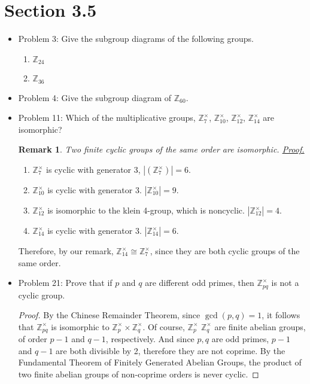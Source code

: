 \documentclass[hidelinks,12pt]{article}
\title{\scalebox{2}{Math 531 Homework 6}}
\author{\scalebox{1.5}{Theo Koss}}
\date{March 2021}
\newtheorem*{remark}{Remark}
\newcommand{\Z}{\mathbb{Z}}
\begin{document}
\graphicspath{{/home/theo/Documents/GitHub/Math-Homeworks/Math 531/Random/}}
\maketitle
\section{Section 3.5}
\begin{itemize}
\item Problem 3: Give the subgroup diagrams of the following groups.\begin{enumerate}[label=(\alph*)]
    \item $\Z_{24}$\newline{}
    \item $\Z_{36}$\newline{}
\end{enumerate}
\item Problem 4: Give the subgroup diagram of $\Z_{60}$.\newline{}
\item Problem 11: Which of the multiplicative groups, $\Z^{\times}_7$, $\Z^{\times}_{10}$, $\Z^{\times}_{12}$, $\Z^{\times}_{14}$ are isomorphic?\newline \begin{remark}Two finite cyclic groups of the same order are isomorphic. \href{https://proofwiki.org/wiki/Cyclic_Groups_of_Same_Order_are_Isomorphic}{\color{cyan}Proof.} \end{remark}\begin{enumerate}
    \item $\Z^{\times}_7$ is cyclic with generator 3, $|(\Z^{\times}_7)|=6$.
    \item $\Z^{\times}_{10}$ is cyclic with generator 3. $|\Z^{\times}_{10}|=9$.
    \item $\Z^{\times}_{12}$ is isomorphic to the klein 4-group, which is noncyclic. $|\Z^{\times}_{12}|=4$.
    \item $\Z^{\times}_{14}$ is cyclic with generator 3. $|\Z^{\times}_{14}|=6$.
\end{enumerate}Therefore, by our remark, $\Z^{\times}_{14}\cong\Z^{\times}_7$, since they are both cyclic groups of the same order.
\item Problem 21: Prove that if $p$ and $q$ are different odd primes, then $\Z^{\times}_{pq}$ is not a cyclic group.\begin{proof} By the Chinese Remainder Theorem, since $\gcd(p,q)=1$, it follows that $\Z^{\times}_{pq}$ is isomorphic to $\Z^{\times}_p\times\Z^{\times}_q$. Of course, $\Z^{\times}_p$ $\Z^{\times}_q$ are finite abelian groups, of order $p-1$ and $q-1$, respectively. And since $p,q$ are odd primes, $p-1$ and $q-1$ are both divisible by 2, therefore they are not coprime. By the Fundamental Theorem of Finitely Generated Abelian Groups, the product of two finite abelian groups of non-coprime orders is never cyclic. 
\end{proof}
\end{itemize}
\end{document}
